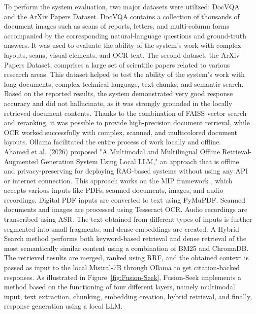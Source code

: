 \documentclass[11pt,a4paper]{report}
\begin{document}
To perform the system evaluation, two major datasets were utilized: DocVQA and the ArXiv Papers Dataset. DocVQA contains a collection of thousands of document images such as scans of reports, letters, and multi-column forms accompanied by the corresponding natural-language questions and ground-truth answers. It was used to evaluate the ability of the system's work with complex layouts, scans, visual elements, and \ac{OCR} text. The second dataset, the ArXiv Papers Dataset, comprises a large set of scientific papers related to various research areas. This dataset helped to test the ability of the system's work with long documents, complex technical language, text chunks, and semantic search. Based on the reported results, the system demonstrated very good response accuracy and did not hallucinate, as it was strongly grounded in the locally retrieved document contents. Thanks to the combination of \ac{FAISS} vector search and reranking, it was possible to provide high-precision document retrieval, while \ac{OCR} worked successfully with complex, scanned, and multicolored document layouts. Ollama facilitated the entire process of work locally and offline.\\

Ahamed et al. \cite{AlthafAhamed2026AMA} (2026) proposed "A Multimodal and Multilingual Offline Retrieval-Augmented Generation System Using Local \ac{LLM}," an approach that is offline and privacy-preserving for deploying \ac{RAG}-based systems without using any \ac{API} or internet connection. This approach works on the \ac{MIP} framework , which accepts various inputs like \acp{PDF}, scanned documents, images, and audio recordings. Digital \ac{PDF} inputs are converted to text using PyMuPDF. Scanned documents and images are processed using Tesseract \ac{OCR}. Audio recordings are transcribed using \ac{ASR}. The text obtained from different types of inputs is further segmented into small fragments, and dense embeddings are created. A Hybrid Search method performs both keyword-based retrieval and dense retrieval of the most semantically similar content using a combination of \ac{BM25} and ChromaDB. The retrieved results are merged, ranked using \ac{RRF}, and the obtained context is passed as input to the local Mistral-7B through Ollama to get citation-backed responses. As illustrated in Figure~\ref{fig:Fusion-Seek}, Fusion-Seek implements a method based on the functioning of four different layers, namely multimodal input, text extraction, chunking, embedding creation, hybrid retrieval, and finally, response generation using a local \ac{LLM}.
\end{document}
